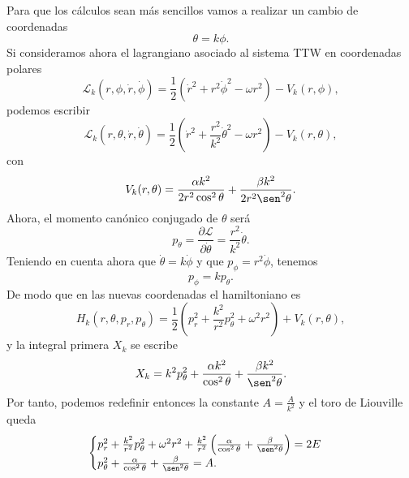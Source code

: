 \documentclass[11pt,a4paper,twoside]{article}
\theoremstyle{definition} \newtheorem{defn}[thm]{Definición}
\theoremstyle{definition} \newtheorem{ejemplo}[thm]{Ejemplo}
\theoremstyle{definition} \newtheorem{ejercicio}[thm]{Ejercicio}
\theoremstyle{remark} \newtheorem*{obs}{Observación}
\begin{document}
Para que los cálculos sean más sencillos vamos a realizar un cambio de coordenadas 
\begin{equation}
 \theta=k\phi. 
\end{equation}
Si consideramos ahora el lagrangiano asociado al sistema TTW en coordenadas polares
\begin{equation}
  \mathcal{L} _k(r,\phi,\dot{r},\dot{\phi})=\frac{1}{2}\left(\dot{r}^2+r^2\dot{\phi}^2-\omega r^2\right)-V_k(r,\phi), 
\end{equation}
podemos escribir
\begin{equation}
  \mathcal{L} _k(r,\theta,\dot{r},\dot{\theta})=\frac{1}{2}\left(\dot{r}^2+\frac{r^2}{k^2}\dot{\theta}^2-\omega r^2\right)-V_k(r,\theta), 
\end{equation}
con
\begin{equation}
  V_k(r,\theta)=\frac{\alpha k^2}{2r^2\cos^2 \theta}+\frac{\beta k^2}{2r^2\sen^2 \theta}.
\end{equation}
Ahora, el momento canónico conjugado de $\theta$ será
\begin{equation}
  p_\theta=\frac{\partial \mathcal{L} }{\partial \dot{\theta}}=\frac{r^2}{k^2}\dot{\theta}. 
\end{equation}
Teniendo en cuenta ahora que $\dot{\theta}=k\dot{\phi}$ y que $p_{\phi}=r^2\dot{\phi}$, tenemos
\begin{equation}
  p_{\phi}=kp_\theta. 
\end{equation}
De modo que en las nuevas coordenadas el hamiltoniano es
\begin{equation}
  H_k(r,\theta,p_r,p_{\theta})=\frac{1}{2}\left( p_r^2+\frac{k^2}{r^2}p^2_{\theta} +\omega^2 r^2 \right) + V_k(r,\theta),
\end{equation}
y la integral primera $X_k$ se escribe
\begin{equation}
  X_k=k^2p_{\theta}^2+\frac{\alpha k^2}{\cos^2 \theta}+\frac{\beta k^2}{\sen^2 \theta}.
\end{equation}
Por tanto, podemos redefinir entonces la constante $A=\frac{A}{k^2}$ y el toro de Liouville queda
\begin{equation}
  \begin{cases}
    p_r^2+\frac{k^2}{r^2}p_{\theta}^2+\omega^2r^2 + \frac{k^2}{r^2}\left( \frac{\alpha}{\cos^2\theta} +\frac{\beta}{\sen^2\theta}\right) = 2E \\
    p_{\theta}^2+ \frac{\alpha}{\cos^2\theta} +\frac{\beta}{\sen^2\theta}=A.
  \end{cases}
  \label{eq:toro}
\end{equation}
\end{document}
